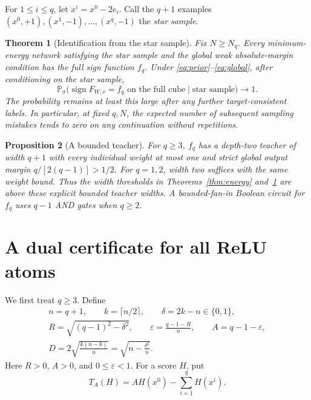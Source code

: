 \documentclass[11pt]{article}
\newtheorem{theorem}{Theorem}
\newtheorem{proposition}[theorem]{Proposition}
\newcommand{\Pp}{\mathbb P}
\begin{document}
For $1\le i\le q$, let $x^i=x^0-2e_i$. Call the $q+1$ examples
$(x^0,+1),(x^1,-1),\ldots,(x^q,-1)$ the \emph{star sample}.

\begin{theorem}[Identification from the star sample]\label{thm:posterior}
Fix $N\ge N_q$. Every minimum-energy network satisfying the star
sample and the global weak absolute-margin condition has the full
sign function $f_q$. Under \eqref{eq:prior}--\eqref{eq:global}, after
conditioning on the star sample,
\[
 \Pp_\sigma\bigl(\operatorname{sign}F_{W,v}=f_q
       \text{ on the full cube}\mid\text{star sample}\bigr)
       \longrightarrow1.
\]
The probability remains at least this large after any further
target-consistent labels. In particular, at fixed $q,N$, the expected
number of subsequent sampling mistakes tends to zero on any
continuation without repetitions.
\end{theorem}

\begin{proposition}[A bounded teacher]\label{prop:teacher}
For $q\ge3$, $f_q$ has a depth-two teacher of width $q+1$ with every
individual weight at most one and strict global output margin
$q/[2(q-1)]>1/2$. For $q=1,2$, width two suffices with the same weight
bound. Thus the width thresholds in Theorems~\ref{thm:energy}
and~\ref{thm:posterior} are above these explicit bounded teacher
widths. A bounded-fan-in Boolean circuit for $f_q$ uses $q-1$ AND
gates when $q\ge2$.
\end{proposition}

\section{A dual certificate for all ReLU atoms}

We first treat $q\ge3$. Define
\begin{equation}\label{eq:parameters}
 \begin{gathered}
 n=q+1,\qquad k=\lceil n/2\rceil,\qquad \delta=2k-n\in\{0,1\},\\
 R=\sqrt{(q-1)^2-\delta^2},\qquad
 \varepsilon=\frac{q-1-R}{n},\qquad A=q-1-\varepsilon,\\
 D=2\sqrt{\frac{k(n-k)}n}=\sqrt{n-\frac{\delta^2}n}.
 \end{gathered}
\end{equation}
Here $R>0$, $A>0$, and $0\le\varepsilon<1$.
For a score $H$, put
\begin{equation}\label{eq:dual}
 T_A(H)=A H(x^0)-\sum_{i=1}^q H(x^i).
\end{equation}
\end{document}
